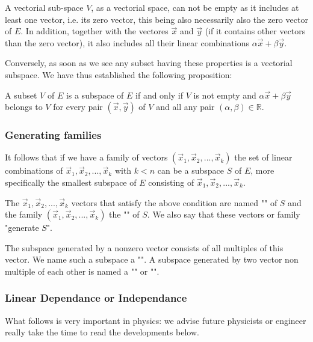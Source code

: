 	A vectorial sub-space $V$, as a vectorial space, can not be empty as it includes at least one vector, i.e. its zero vector, this being also necessarily also the zero vector of $E$. In addition, together with the vectores $\vec{x}$ and $\vec{y}$ (if it contains other vectors than the zero vector), it also includes all their linear combinations $\alpha\vec{x}+\beta\vec{y}$.
	
	Conversely, as soon as we see any subset having these properties is a vectorial subspace. We have thus established the following proposition:
	
	A subset $V$ of $E$ is a subspace of $E$ if and only if $V$ is not empty and $\alpha\vec{x}+\beta\vec{y}$ belongs to $V$ for every pair $(\vec{x},\vec{y})$ of $V$ and all any pair $(\alpha,\beta) \in \mathbb{R}$.
	
	\subsubsection{Generating families}
	It follows that if we have a family of vectors $(\vec{x}_1,\vec{x}_2,...,\vec{x}_k)$ the set of linear combinations of $\vec{x}_1,\vec{x}_2,...,\vec{x}_k$ with $k<n$ can be a subspace $S$ of $E$, more specifically the smallest subspace of $E$ consisting of $\vec{x}_1,\vec{x}_2,...,\vec{x}_k$.
	
	The $\vec{x}_1,\vec{x}_2,...,\vec{x}_k$ vectors that satisfy the above condition are named "" of $S$ and the family $(\vec{x}_1,\vec{x}_2,...,\vec{x}_k)$ the "" of $S$. We also say that these vectors or family "generate $S$".
	
	\begin{tcolorbox}[title=Remark,colframe=black,arc=10pt]
The subspace generated by a nonzero vector consists of all multiples of this vector. We name such a subspace a "". A subspace generated by two vector non multiple of each other is named a "" or "".
	\end{tcolorbox}
	
	\subsubsection{Linear Dependance or Independance}
	What follows is very important in physics: we advise future physicists or engineer really take the time to read the developments below.
	
